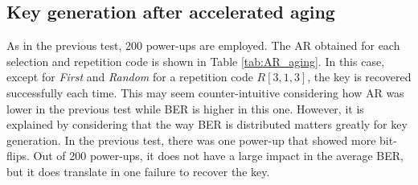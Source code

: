 \begin{table}[H]
  \caption{BER and AR value for the different selections when performing 200 power-ups at $\SI{-20}{\degree C}$ using two different repetition codes.}
  \label{tab:AR_-20C}%
\end{table}%

\subsection{Key generation after accelerated aging}

As in the previous test, 200 power-ups are employed. The AR obtained for each selection and repetition code is shown in Table \ref{tab:AR_aging}. In this case, except for \textit{First} and \textit{Random} for a repetition code $R[3,1,3]$, the key is recovered successfully each time. This may seem counter-intuitive considering how AR was lower in the previous test while BER is higher in this one. However, it is explained by considering that the way BER is distributed matters greatly for key generation. In the previous test, there was one power-up that showed more bit-flips. Out of 200 power-ups, it does not have a large impact in the average BER, but it does translate in one failure to recover the key. 

